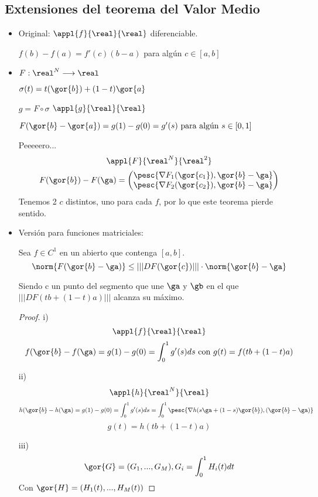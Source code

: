 \documentclass{apuntes}
\begin{document}
\subsection{Extensiones del teorema del Valor Medio}
\begin{itemize}
 \item Original:
 $\appl{f}{\real}{\real}$ diferenciable. 
 
 $f(b)-f(a) = f'(c)(b-a)$ para algún $c\in[a,b]$
 
 \item
  
 $F : \real^N  \longrightarrow \real$
 
 $\sigma(t)  = t(\gor{b})+(1-t)\gor{a}$
 
 $g  = F\circ \sigma$
 $\appl{g}{\real }{\real}$
 
 $F(\gor{b}-\gor{a}) = g(1)-g(0)  = g'(s) \text{ para algún }s\in[0,1]$
 
  
  Peeeeero...
  $$\appl{F}{\real^N}{\real^2}$$
  $$F(\gor{b})-F(\ga) = \begin{pmatrix}
                         \pesc{\nabla F_1(\gor{c_1}),{\gor{b}-\ga}}\\
                         \pesc{\nabla F_2(\gor{c_2}),\gor{b}-\ga}
                        \end{pmatrix}
$$
  Tenemos 2 $c$ distintos, uno para cada $f$, por lo que este teorema pierde sentido.
  
  \item Versión para funciones matriciales:
  
  \begin{theorem} 
  Sea $f \in C^1$ en un abierto que contenga $[a,b]$.
  $$\norm{F(\gor{b}-\ga)} \leq |||DF(\gor{c})|||\cdot\norm{\gor{b}-\ga}$$ 
  
  Siendo c un punto del segmento que une $\ga$ y $\gb$ en el que $|||DF(tb+(1-t)a)|||$ alcanza su máximo.
   
  \end{theorem}

  
  
  \begin{proof}
   i) $$\appl{f}{\real}{\real}$$
   $$f(\gor{b}-f(\ga) = g(1)-g(0) = \int_0^1g'(s)ds \text{ con } g(t) = f(tb+(1-t)a)$$
   
   ii)  $$\appl{h}{\real^N}{\real}$$
   $$h(\gor{b}-h(\ga) = g(1)-g(0) = \int_0^1g'(s)ds = \int_0^1 \pesc{\nabla h(s\ga+(1-s)\gor{b}),(\gor{b}-\ga)}$$
   $$g(t) = h(tb+(1-t)a)$$
   
   iii) $$\gor{G} = (G_1,...,G_M), G_i = \int_0^1H_i(t)dt$$
   Con $\gor{H} = (H_1(t),...,H_M(t))$
   

\end{proof}
\end{itemize}
\end{document}
